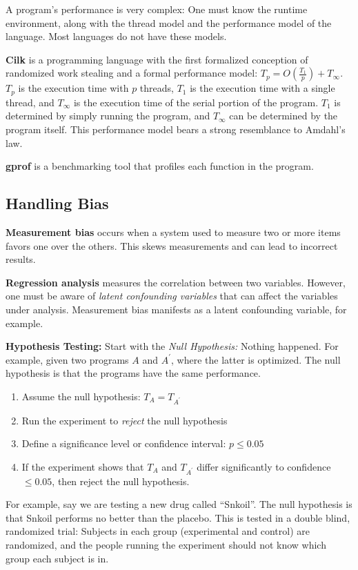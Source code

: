 \documentclass[twoside]{article}
\begin{document}
A program's performance is very complex: One must know the runtime environment,
along with the thread model and the performance model of the language. Most
languages do not have these models.

\textbf{Cilk} is a programming language with the first formalized conception of
randomized work stealing and a formal performance model: $T_p = O(\frac{T_1}{p})
+ T_\infty$. $T_p$ is the execution time with $p$ threads, $T_1$ is the
execution time with a single thread, and $T_\infty$ is the execution time of the
serial portion of the program. $T_1$ is determined by simply running the
program, and $T_\infty$ can be determined by the program itself. This
performance model bears a strong resemblance to Amdahl's law.

\textbf{gprof} is a benchmarking tool that profiles each function in the
program.

\subsection{Handling Bias}

\textbf{Measurement bias} occurs when a system used to measure two or more items
favors one over the others. This skews measurements and can lead to incorrect
results.

\textbf{Regression analysis} measures the correlation between two variables.
However, one must be aware of \emph{latent confounding variables} that can
affect the variables under analysis. Measurement bias manifests as a latent
confounding variable, for example.

\textbf{Hypothesis Testing:} Start with the \emph{Null Hypothesis:} Nothing
happened. For example, given two programs $A$ and $A^\prime$, where the latter
is optimized. The null hypothesis is that the programs have the same
performance.

\begin{enumerate}
  \item Assume the null hypothesis: $T_A = T_{A^\prime}$
  \item Run the experiment to \emph{reject} the null hypothesis
  \item Define a significance level or confidence interval: $p \le 0.05$
  \item If the experiment shows that $T_A$ and $T_{A^\prime}$ differ
    significantly to confidence $\le 0.05$, then reject the null hypothesis.
\end{enumerate}

For example, say we are testing a new drug called ``Snkoil''. The null
hypothesis is that Snkoil performs no better than the placebo. This is tested in
a double blind, randomized trial: Subjects in each group (experimental and
control) are randomized, and the people running the experiment should not know
which group each subject is in.
\end{document}
